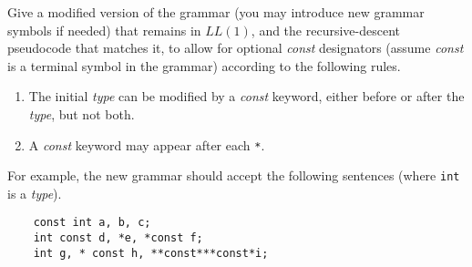 \documentclass[10pt]{article}
\begin{document}
Give a modified version of the grammar
(you may introduce new grammar symbols if needed)
that remains in $LL(1)$,
and the recursive-descent pseudocode that matches it,
to allow for optional \emph{const} designators
(assume \emph{const} is a terminal symbol in the grammar)
according to the following rules.
\begin{enumerate}
	\item
	The initial \emph{type} can be modified by
	a \emph{const} keyword, either before or after
	the \emph{type}, but not both.

	\item
	A \emph{const} keyword may appear after each \verb|*|.
\end{enumerate}
For example, the new grammar should accept
the following sentences (where {\tt int} is a \emph{type}).
\begin{verbatim}
	const int a, b, c;
	int const d, *e, *const f;
	int g, * const h, **const***const*i;
\end{verbatim}
\end{document}
